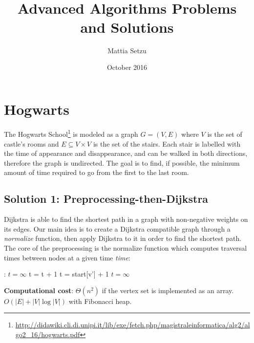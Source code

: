 \documentclass{article}
\title{Advanced Algorithms Problems and Solutions}
\author{Mattia Setzu}
\date{October 2016}
\begin{document}
\maketitle

\tableofcontents
\clearpage

\section{Hogwarts}

The Hogwarts School\footnote{\url{http://didawiki.cli.di.unipi.it/lib/exe/fetch.php/magistraleinformatica/alg2/algo2_16/hogwarts.pdf}} is modeled as a graph $G=(V, E)$ where $V$ is the set of castle's rooms and $E \subseteq V \times V$ is the set of the stairs. Each stair is labelled with the time of appearance and disappearance, and can be walked in both directions, therefore the graph is undirected. The goal is to find, if possible, the minimum amount of time required to go from the first to the last room.

\subsection{Solution 1: Preprocessing-then-Dijkstra}

Dijkstra is able to find the shortest path in a graph with non-negative weights on its edges. Our main idea is to create a Dijkstra compatible graph through a \emph{normalize} function, then apply Dijkstra to it in order to find the shortest path.
The core of the preprocessing is the normalize function which computes traversal times between nodes at a given time \emph{time}:
\begin{algorithmic}[1]
  :
    \State $t = \infty$
    \State {}    
        \State t = t + 1\;
    \State {}              
      \State t = start[v'] + 1\;
    \State \Else
      \State $t = \infty$\;                     
    \EndIf \\
    \EndFunction
\end{algorithmic}

\begin{framed}
  \noindent
  \textbf{Computational cost}: $\Theta(n^{2})$ if the vertex set is implemented as an array. $O(|E|+|V|\log |V|)$ with Fibonacci heap.
\end{framed}
\end{document}
